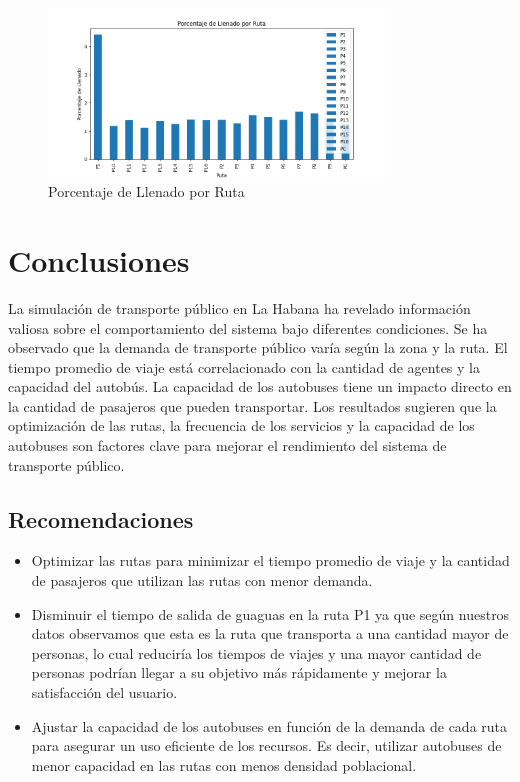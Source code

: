 \documentclass[a4paper,12pt]{article}
\begin{document}
\begin{figure}[H]
    \centering
    \includegraphics[width=0.8\textwidth]{imgs/llenado_ruta.png}
    \caption{Porcentaje de Llenado por Ruta}
    \label{fig:3}
\end{figure}


\section{Conclusiones}

La simulación de transporte público en La Habana ha revelado información valiosa sobre el comportamiento del sistema bajo diferentes condiciones. Se ha observado que la demanda de transporte público varía según la zona y la ruta. El tiempo promedio de viaje está correlacionado con la cantidad de agentes y la capacidad del autobús. La capacidad de los autobuses tiene un impacto directo en la cantidad de pasajeros que pueden transportar. Los resultados sugieren que la optimización de las rutas, la frecuencia de los servicios y la capacidad de los autobuses son factores clave para mejorar el rendimiento del sistema de transporte público.

\subsection{Recomendaciones}

\begin{itemize}
\item Optimizar las rutas para minimizar el tiempo promedio de viaje y la cantidad de pasajeros que utilizan las rutas con menor demanda.
\item Disminuir el tiempo de salida de guaguas en la ruta P1 ya que según nuestros datos observamos que esta es la ruta que transporta a una cantidad mayor de personas, lo cual reduciría los tiempos de viajes y una mayor cantidad de personas podrían llegar a su objetivo más rápidamente y mejorar la satisfacción del usuario.
\item Ajustar la capacidad de los autobuses en función de la demanda de cada ruta para asegurar un uso eficiente de los recursos. Es decir, utilizar autobuses de menor capacidad en las rutas con menos densidad poblacional.
\end{itemize}
\end{document}
